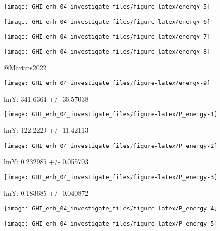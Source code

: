 \documentclass[
  10pt,
  a4paper,oneside]{article}
\begin{document}
\begin{center}\texttt{[image: GHI\_enh\_04\_investigate\_files/figure-latex/energy-5]} \end{center}

\begin{center}\texttt{[image: GHI\_enh\_04\_investigate\_files/figure-latex/energy-6]} \end{center}

\begin{center}\texttt{[image: GHI\_enh\_04\_investigate\_files/figure-latex/energy-7]} \end{center}

\begin{center}\texttt{[image: GHI\_enh\_04\_investigate\_files/figure-latex/energy-8]} \end{center}

@Martins2022

\begin{center}\texttt{[image: GHI\_enh\_04\_investigate\_files/figure-latex/energy-9]} \end{center}

lmY: 341.6364 +/- 36.57038

\begin{center}\texttt{[image: GHI\_enh\_04\_investigate\_files/figure-latex/P\_energy-1]} \end{center}

lmY: 122.2229 +/- 11.42113

\begin{center}\texttt{[image: GHI\_enh\_04\_investigate\_files/figure-latex/P\_energy-2]} \end{center}

lmY: 0.232986 +/- 0.055703

\begin{center}\texttt{[image: GHI\_enh\_04\_investigate\_files/figure-latex/P\_energy-3]} \end{center}

lmY: 0.183685 +/- 0.040872

\begin{center}\texttt{[image: GHI\_enh\_04\_investigate\_files/figure-latex/P\_energy-4]} \end{center}

\begin{center}\texttt{[image: GHI\_enh\_04\_investigate\_files/figure-latex/P\_energy-5]} \end{center}
\end{document}
